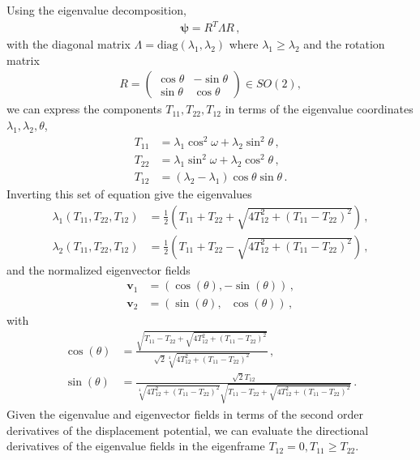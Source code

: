 \documentclass[a4paper, 11pt]{article}
\begin{document}
Using the eigenvalue decomposition,
\begin{align}
\bm{\psi} = R^T \Lambda R\,,
\end{align}
with the diagonal matrix $\Lambda = \text{diag}(\lambda_1,\lambda_2)$ where $\lambda_1 \geq \lambda_2$ and the rotation matrix
\begin{align}
R = \begin{pmatrix} \cos \theta & - \sin \theta \\ \sin \theta & \cos \theta \end{pmatrix} \in SO(2),
\end{align}
we can express the components $T_{11},T_{22},T_{12}$ in terms of the eigenvalue coordinates $\lambda_1,\lambda_2,\theta$,
\begin{align}
T_{11} &= \lambda_1 \cos^2 \omega + \lambda_2 \sin^2 \theta\,,\\
T_{22} &= \lambda_1 \sin^2\omega + \lambda_2 \cos^2 \theta\,,\\
T_{12} &= (\lambda_2 - \lambda_1)\cos \theta \sin \theta\,.
\end{align}
Inverting this set of equation give the eigenvalues
\begin{align}
\lambda_1(T_{11},T_{22},T_{12}) &= \frac{1}{2}\left(T_{11}+T_{22} + \sqrt{4 T_{12}^2 +(T_{11}-T_{22})^2}\right)\,,\\
\lambda_2(T_{11},T_{22},T_{12}) &= \frac{1}{2}\left(T_{11}+T_{22} - \sqrt{4 T_{12}^2 +(T_{11}-T_{22})^2}\right)\,,
\end{align}
and the normalized eigenvector fields
\begin{align}
\bm{v}_1 &= (\cos(\theta), -\sin(\theta))\,,\\
\bm{v}_2 &= (\sin(\theta),\ \ \ \cos(\theta))\,,
\end{align}
with
\begin{align}
\cos(\theta) &= \frac{\sqrt{T_{11} - T_{22} + \sqrt{4 T_{12}^2 +(T_{11}-T_{22})^2}}}{\sqrt{2} \sqrt[4]{4T_{12}^2 + (T_{11}-T_{22})^2}}\,,\\
\sin(\theta) &= \frac{\sqrt{2}T_{12}}{\sqrt[4]{4T_{12}^2+(T_{11}-T_{22})^2}\sqrt{T_{11}-T_{22} + \sqrt{4T_{12}^2 + (T_{11}-T_{22})^2}}}\,.
\end{align}
Given the eigenvalue and eigenvector fields in terms of the second order derivatives of the displacement potential, we can evaluate the directional derivatives of the eigenvalue fields in the eigenframe $T_{12}=0, T_{11} \geq T_{22}$.
\end{document}
